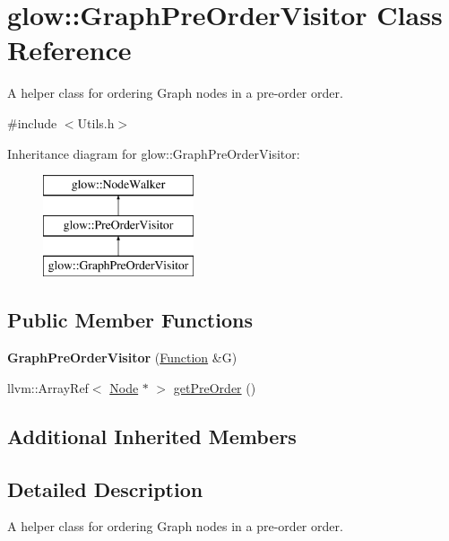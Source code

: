 \hypertarget{classglow_1_1_graph_pre_order_visitor}{}\section{glow\+:\+:Graph\+Pre\+Order\+Visitor Class Reference}
\label{classglow_1_1_graph_pre_order_visitor}


A helper class for ordering Graph nodes in a pre-\/order order.  




{\ttfamily \#include $<$Utils.\+h$>$}

Inheritance diagram for glow\+:\+:Graph\+Pre\+Order\+Visitor\+:\begin{figure}[H]
\begin{center}
\leavevmode
\includegraphics[height=3.000000cm]{classglow_1_1_graph_pre_order_visitor}
\end{center}
\end{figure}
\subsection*{Public Member Functions}
\begin{DoxyCompactItemize}
\item 
\mbox{\label{classglow_1_1_graph_pre_order_visitor_aab431aa994c626cc32184663442670f0}} 
{\bfseries Graph\+Pre\+Order\+Visitor} (\hyperlink{classglow_1_1_function}{Function} \&G)
\item 
llvm\+::\+Array\+Ref$<$ \hyperlink{classglow_1_1_node}{Node} $\ast$ $>$ \hyperlink{classglow_1_1_graph_pre_order_visitor_aa835bc58821a8d48b43146c0b47500b2}{get\+Pre\+Order} ()
\end{DoxyCompactItemize}
\subsection*{Additional Inherited Members}


\subsection{Detailed Description}
A helper class for ordering Graph nodes in a pre-\/order order. 

